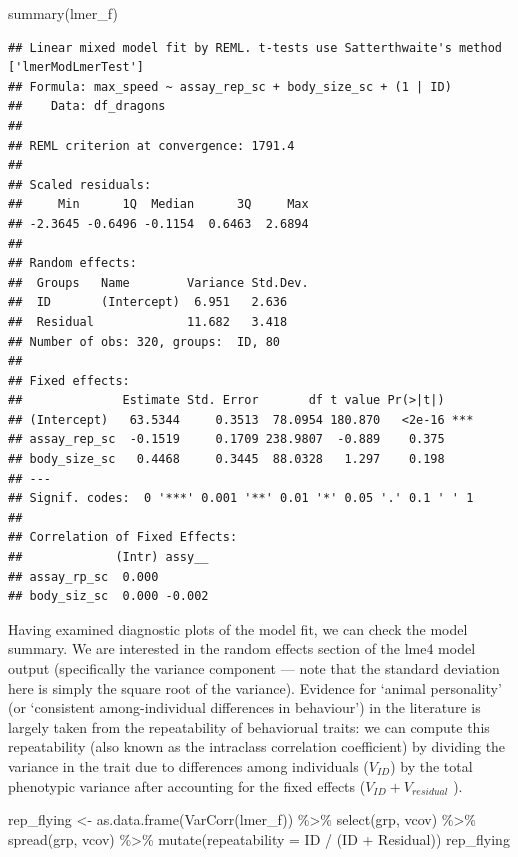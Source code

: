 \documentclass[
  12pt,
]{book}
\newenvironment{Shaded}{\begin{snugshade}}{\end{snugshade}}
\newcommand{\AttributeTok}[1]{\textcolor[rgb]{0.77,0.63,0.00}{#1}}
\newcommand{\FunctionTok}[1]{\textcolor[rgb]{0.00,0.00,0.00}{#1}}
\newcommand{\NormalTok}[1]{#1}
\newcommand{\OtherTok}[1]{\textcolor[rgb]{0.56,0.35,0.01}{#1}}
\newcommand{\SpecialCharTok}[1]{\textcolor[rgb]{0.00,0.00,0.00}{#1}}
\begin{document}
\begin{Shaded}
\begin{Highlighting}[]
\FunctionTok{summary}\NormalTok{(lmer\_f)}
\end{Highlighting}
\end{Shaded}

\begin{verbatim}
## Linear mixed model fit by REML. t-tests use Satterthwaite's method ['lmerModLmerTest']
## Formula: max_speed ~ assay_rep_sc + body_size_sc + (1 | ID)
##    Data: df_dragons
## 
## REML criterion at convergence: 1791.4
## 
## Scaled residuals: 
##     Min      1Q  Median      3Q     Max 
## -2.3645 -0.6496 -0.1154  0.6463  2.6894 
## 
## Random effects:
##  Groups   Name        Variance Std.Dev.
##  ID       (Intercept)  6.951   2.636   
##  Residual             11.682   3.418   
## Number of obs: 320, groups:  ID, 80
## 
## Fixed effects:
##              Estimate Std. Error       df t value Pr(>|t|)    
## (Intercept)   63.5344     0.3513  78.0954 180.870   <2e-16 ***
## assay_rep_sc  -0.1519     0.1709 238.9807  -0.889    0.375    
## body_size_sc   0.4468     0.3445  88.0328   1.297    0.198    
## ---
## Signif. codes:  0 '***' 0.001 '**' 0.01 '*' 0.05 '.' 0.1 ' ' 1
## 
## Correlation of Fixed Effects:
##             (Intr) assy__
## assay_rp_sc  0.000       
## body_siz_sc  0.000 -0.002
\end{verbatim}

Having examined diagnostic plots of the model fit, we can check the model summary. We are interested in the random effects section of the lme4 model output (specifically the variance component --- note that the standard deviation here is simply the square root of the variance). Evidence for `animal personality' (or `consistent among-individual differences in behaviour') in the literature is largely taken from the repeatability of behaviorual traits: we can compute this repeatability (also known as the intraclass correlation coefficient) by dividing the variance in the trait due to differences among individuals (\(V_{ID}\)) by the total phenotypic variance after accounting for the fixed effects (\(V_{ID} + V_{residual}\) ).

\begin{Shaded}
\begin{Highlighting}[]
\NormalTok{rep\_flying }\OtherTok{\textless{}{-}} \FunctionTok{as.data.frame}\NormalTok{(}\FunctionTok{VarCorr}\NormalTok{(lmer\_f)) }\SpecialCharTok{\%\textgreater{}\%}
  \FunctionTok{select}\NormalTok{(grp, vcov) }\SpecialCharTok{\%\textgreater{}\%}
  \FunctionTok{spread}\NormalTok{(grp, vcov) }\SpecialCharTok{\%\textgreater{}\%}
  \FunctionTok{mutate}\NormalTok{(}\AttributeTok{repeatability =}\NormalTok{ ID }\SpecialCharTok{/}\NormalTok{ (ID }\SpecialCharTok{+}\NormalTok{ Residual))}
\NormalTok{rep\_flying}
\end{Highlighting}
\end{Shaded}
\end{document}
